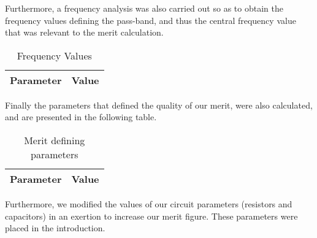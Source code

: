 \par

Furthermore, a frequency analysis was also carried out so as to obtain the frequency values defining the pass-band, and thus the central frequency value that was relevant to the merit calculation.

\vspace{10.0cm}

\begin{table}[h]
  \centering
  \begin{tabular}{|l|r|}
    \hline    
    {\bf Parameter} & {\bf Value} \\ \hline
    
  \end{tabular}
  \caption{ Frequency Values }
\end{table}
\par
Finally the parameters that defined the quality of our merit, were also calculated, and are presented in the following table.

\begin{table}[h]
  \centering
  \begin{tabular}{|l|r|}
    \hline    
    {\bf Parameter} & {\bf Value} \\ \hline
    
  \end{tabular}
  \caption{ Merit defining parameters  }
\end{table}

Furthermore, we modified the values of our circuit parameters (resistors and capacitors) in an exertion to increase our merit figure. These parameters were placed in the introduction.


